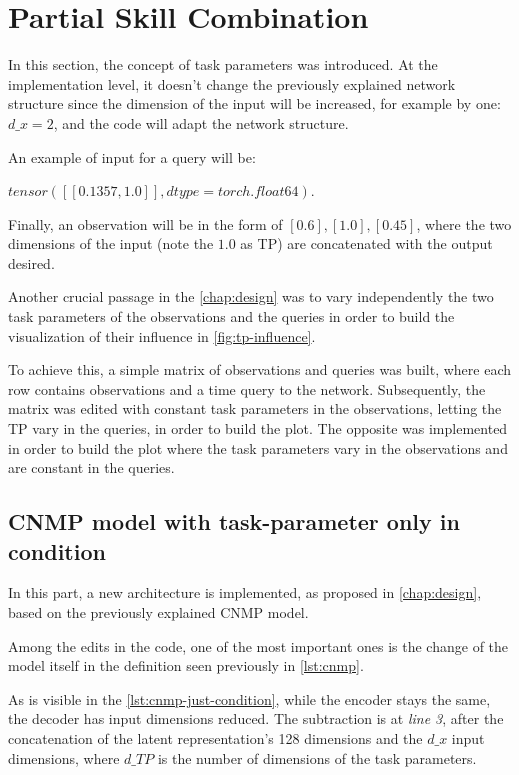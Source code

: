\section{Partial Skill Combination}
In this section, the concept of task parameters was introduced. At the implementation level, it doesn't change the previously explained network structure since the dimension of the input will be increased, for example by one: $d\_x = 2$, and the code will adapt the network structure.

An example of input for a query will be: 

$tensor([[0.1357, 1.0]], dtype=torch.float64)$. 

Finally, an observation will be in the form of $[0.6],[1.0],[0.45]$, where the two dimensions of the input (note the $1.0$ as TP) are concatenated with the output desired.

Another crucial passage in the \cref{chap:design} was to vary independently the two task parameters of the observations and the queries in order to build the visualization of their influence in \cref{fig:tp-influence}. 

To achieve this, a simple matrix of observations and queries was built, where each row contains observations and a time query to the network. Subsequently, the matrix was edited with constant task parameters in the observations, letting the TP vary in the queries, in order to build the plot. The opposite was implemented in order to build the plot where the task parameters vary in the observations and are constant in the queries. 


\subsection{CNMP model with task-parameter only in condition}
In this part, a new architecture is implemented, as proposed in \cref{chap:design}, based on the previously explained CNMP model. 

Among the edits in the code, one of the most important ones is the change of the model itself in the definition seen previously in \cref{lst:cnmp}. 



As is visible in the \cref{lst:cnmp-just-condition}, while the encoder stays the same, the decoder has input dimensions reduced. The subtraction is at \emph{line 3}, after the concatenation of the latent representation's 128 dimensions and the $d\_x$ input dimensions, where $d\_TP$ is the number of dimensions of the task parameters.

